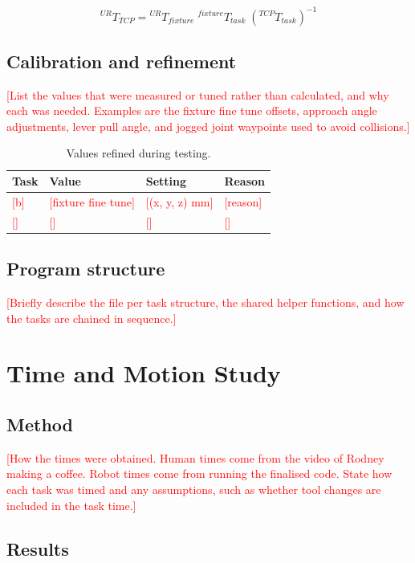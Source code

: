 \documentclass[11pt,a4paper]{article}
\newcommand{\todo}[1]{\textcolor{red}{[#1]}}
\begin{document}
\begin{equation}
{}^{UR}T_{TCP} = {}^{UR}T_{fixture} \; {}^{fixture}T_{task} \; \left({}^{TCP}T_{task}\right)^{-1}
\end{equation}

\subsection{Calibration and refinement}
\todo{List the values that were measured or tuned rather than calculated, and
why each was needed. Examples are the fixture fine tune offsets, approach angle
adjustments, lever pull angle, and jogged joint waypoints used to avoid
collisions.}

\begin{table}[h]
\centering
\caption{Values refined during testing.}
\begin{tabular}{llll}
\toprule
Task & Value & Setting & Reason \\
\midrule
\todo{b} & \todo{fixture fine tune} & \todo{(x, y, z) mm} & \todo{reason} \\
\todo{} & \todo{} & \todo{} & \todo{} \\
\bottomrule
\end{tabular}
\end{table}

\subsection{Program structure}
\todo{Briefly describe the file per task structure, the shared helper functions,
and how the tasks are chained in sequence.}

\section{Time and Motion Study}

\subsection{Method}
\todo{How the times were obtained. Human times come from the video of Rodney
making a coffee. Robot times come from running the finalised code. State how
each task was timed and any assumptions, such as whether tool changes are
included in the task time.}

\subsection{Results}
\end{document}
